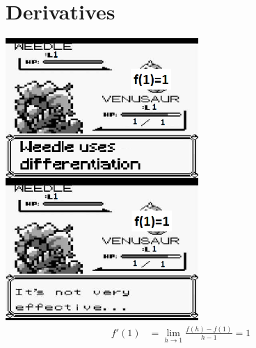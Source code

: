 \setcounter{section}{0}

\section{Derivatives}
\begin{center}
  \includegraphics[width=0.55\textwidth]{differentiation.png}\\
\begin{align*}
  f'(1)&=\lim_{h\to 1}\frac{f(h)-f(1)}{h-1}=1
\end{align*}
\end{center}

